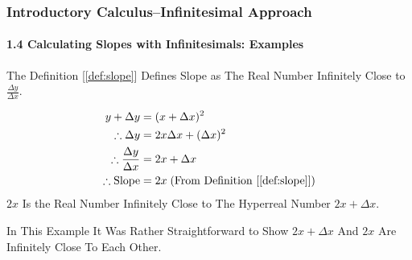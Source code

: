 \begin{frame}
\frametitle{Introductory Calculus--Infinitesimal Approach}
\framesubtitle{1.4 Calculating Slopes with Infinitesimals: Examples}
\label{slide:1.4-10}
\begin{example}[Slope of $y=x^2$]
The Definition [\ref{def:slope}] Defines Slope as \alert{The Real Number Infinitely Close to $\frac{\Delta y}{\Delta x}$}.

\begin{equation}
\begin{aligned}
y+\Delta y &= (x+\Delta x)^2  \\
\therefore \Delta y &= 2x\Delta x+(\Delta x)^2 \\
\therefore \frac{\Delta y}{\Delta x} &= 2x+\Delta x \\
\therefore \text{Slope}&=2x \;\text{(From Definition [\ref{def:slope}])}
\end{aligned}
\label{eq:slope-of-y=x^2}
\end{equation}
\pause
$2x$ Is the \alert{Real Number Infinitely Close to The Hyperreal Number $2x+\Delta x$}.
\end{example}
\pause
In This Example It Was Rather Straightforward to Show $2x+\Delta x$ And $2x$ Are Infinitely Close To Each Other. 
\end{frame}
